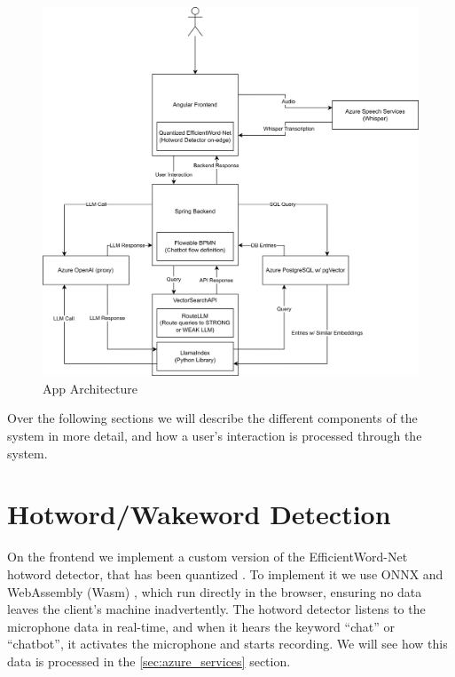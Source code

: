 \documentclass[a4paper,12pt,twoside]{ThesisStyle}
\begin{document}
\begin{figure}[htb]
  \centering
  \includegraphics[width=1\textwidth]{imatges/Full DSO App Architecture.drawio.png}
  \caption{App Architecture}
  \label{fig:architecture}
\end{figure}

Over the following sections we will describe the different components of the system in more detail, and how a user's interaction is processed through the system.

\section{Hotword/Wakeword Detection}
\label{sec:hotword_detection}

On the frontend we implement a custom version of the EfficientWord-Net \cite{Chidhambararajan2022EfficientWordNet} hotword detector, that has been quantized \cite{Zhang2023PostTrainingQuantizationNeuralNetworks}. To implement it we use ONNX \cite{onnx} and WebAssembly (Wasm) \cite{wasm}, which run directly in the browser, ensuring no data leaves the client's machine inadvertently. The hotword detector listens to the microphone data in real-time, and when it hears the keyword ``chat'' or ``chatbot'', it activates the microphone and starts recording. We will see how this data is processed in the \ref{sec:azure_services} section.
\end{document}

